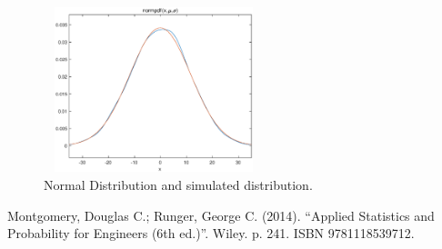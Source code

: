 \documentclass[conference]{IEEEtran}
\begin{document}
\begin{figure}[htbp]
\centering
\includegraphics[height=48mm,width=64mm]{distribution.eps}
\caption{Normal Distribution and simulated distribution. }
\centering
\label{fig:System_Model} \vspace{2mm}
\end{figure}


\begin{thebibliography}{00}
 Montgomery, Douglas C.; Runger, George C. (2014). “Applied Statistics and Probability for Engineers (6th ed.)”. Wiley. p. 241. ISBN 9781118539712.
\end{thebibliography}
\end{document}
